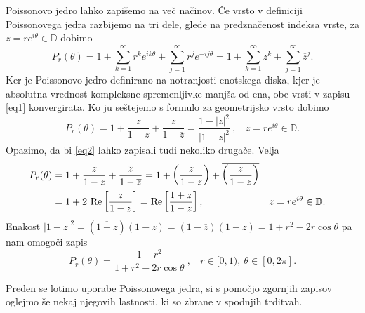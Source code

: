 \documentclass[mat1, tisk]{fmfdelo}
\begin{document}
    Poissonovo jedro lahko zapišemo na več načinov. Če vrsto v definiciji Poissonovega jedra razbijemo na tri dele, glede na predznačenost indeksa vrste, za $z = r e^{i\theta} \in \mathbb{D}$ dobimo
    \begin{equation}
        \label{eq1}
        P_r(\theta) =  1 + \sum_{k = 1}^{\infty}{r^{k} e^{i k \theta}} +  \sum_{j = 1}^{\infty}{r^{j} e^{-i j \theta}}  = 1 + \sum_{k=1}^{\infty}{z^k} + \sum_{j=1}^{\infty}{\overline{z}^{j}}.
    \end{equation}
    Ker je Poissonovo jedro definirano na notranjosti enotskega diska, kjer je absolutna vrednost kompleksne spremenljivke manjša od ena, obe vrsti v zapisu \eqref{eq1} konvergirata.
    Ko ju seštejemo s formulo za geometrijsko vrsto dobimo
    \begin{equation}
        \label{eq2}
        P_r(\theta) = 1 + \frac{z}{1 - z}+ \frac{\overline{z}}{1 - \overline{z}} = \frac{1 - |z|^2}{|1-z|^2}~,~~~~z = r e^{i\theta} \in \mathbb{D}.
    \end{equation}
    Opazimo, da bi \eqref{eq2} lahko zapisali tudi nekoliko drugače. Velja
    \begin{align}
        \label{eq3}
        P_r(\theta) &= 1 + \frac{z}{1 - z}+ \frac{\overline{z}}{1 - \overline{z}} = 1 + \left(\frac{z}{1 - z} \right)+ \overline{\left(\frac{z}{1 - z}\right)} \notag \\
        &= 1 + 2~\text{Re}\left[\frac{z}{1-z}\right] =\text{Re}\left[\frac{1 + z}{1-z}\right], & &z = r e^{i\theta} \in \mathbb{D}.
    \end{align}
    Enakost $|1 - z|^2 = (\overline{1 - z})(1 - z) = (1 - \overline{z})(1 - z) = 1 + r^2 - 2r \cos\theta$ pa nam omogoči zapis
    \begin{equation}
        \label{eq4}
        P_r(\theta) = \frac{1-r^2}{1+ r^2 - 2r \cos\theta}~,~~~~r \in [0,1),~\theta \in [0,2\pi].
    \end{equation}

    Preden se lotimo uporabe Poissonovega jedra, si s pomočjo zgornjih zapisov oglejmo še nekaj njegovih lastnosti, ki so zbrane v spodnjih trditvah. 
    
\end{document}
